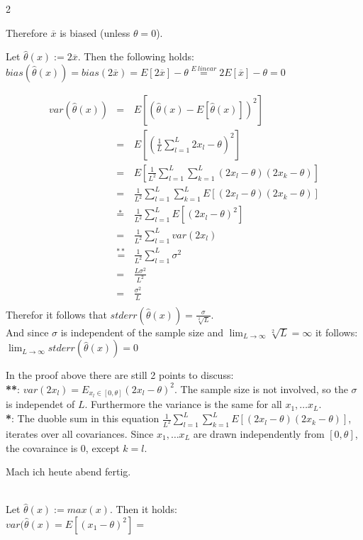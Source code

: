 \documentclass{article}
\begin{document}
\begin{ukon-infie}[3.12.17]{2}
\begin{exercise}[p=20]{}
{		Therefore $\overline{x}$ is biased (unless $\theta = 0$).
		}
		
		\question{}
		{
			Let $\hat{\theta}(x) := 2\overline{x}$. Then the following holds:\\
			$bias(\hat{\theta}(x)) = bias(2 \overline{x}) = E[2 \overline{x}] - \theta \stackrel{E ~linear}{=}2 E[\overline{x}] - \theta = 0$
		}
		
		\question{}
		{
			\begin{eqnarray*}
			var(\hat{\theta}(x))
			&=& E\left[(\hat{\theta}(x) - E[\hat{\theta}(x)])^2\right] \\
			&=& E\left[\left(\frac{1}{L}\sum_{l = 1}^L 2x_l - \theta\right)^2\right] \\
			&=& E\left[\frac{1}{L^2}\sum_{l = 1}^L\sum_{k=1}^L (2x_l - \theta)(2x_k - \theta)\right] \\
			&=& \frac{1}{L^2}\sum_{l = 1}^L\sum_{k=1}^L E\left[(2x_l - \theta)(2x_k - \theta)\right] \\
			&\stackrel{*}{=}& \frac{1}{L^2} \sum_{l = 1}^L E\left[(2x_l - \theta)^2\right] \\
			&=& \frac{1}{L^2} \sum_{l = 1}^L var(2x_l) \\
			&\stackrel{**}{=}&\frac{1}{L^2} \sum_{l = 1}^L \sigma^2 \\
			&=& \frac{L \sigma^2}{L^2}  \\
			&=& \frac{\sigma^2}{L}  \\
			\end{eqnarray*}
			Therefor it follows that $stderr(\hat{\theta}(x)) = \frac{\sigma}{\sqrt[2]{L}}$.\\
			And since $\sigma$ is independent of the sample size and $\lim_{L \to \infty} \sqrt[2]{L} = \infty$ it follows:\\
			$\lim_{L \to \infty} stderr(\hat{\theta}(x)) = 0$
			
			In the proof above there are still 2 points to discuss:\\
			
			\textbf{**}: $var(2x_l) = E_{x_l \in [0,\theta]} (2x_l - \theta)^2$. The sample size is not involved, so the $\sigma$ is independet of $L$. Furthermore the variance is the same for all $x_1, \dots x_L$.\\
			
			\textbf{*}: The duoble sum in this equation $\frac{1}{L^2}\sum_{l = 1}^L\sum_{k=1}^L E\left[(2x_l - \theta)(2x_k - \theta)\right] $, iterates over all covariances. Since $x_1, \dots x_L$ are drawn independently from $[0, \theta]$, the covaraince is 0, except $k=l$.
			
		}
		
		\question{}
		{
			
			Mach ich heute abend fertig.
			
			\\
			
			Let $\hat{\theta}(x) := max(x)$. Then it holds:\\
			
			
			$var(\hat{\theta}(x) = E[(x_1 - \theta)^2] = $
		}
		\end{exercise}
		
		
\end{ukon-infie}
\end{document}
